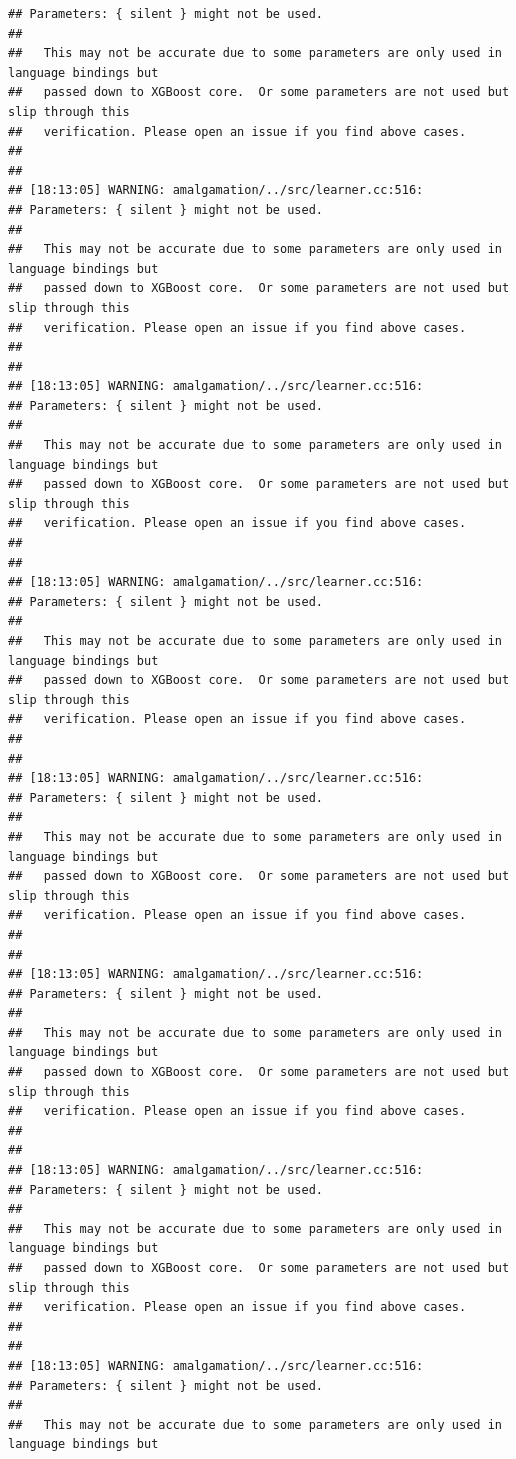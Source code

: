 \documentclass[AMS,STIX2COL]{WileyNJD-v2}\usepackage[]{graphicx}\usepackage[]{color}
\makeatletter
\newenvironment{kframe}{%
 \def\at@end@of@kframe{}%
 \ifinner\ifhmode%
  \def\at@end@of@kframe{\end{minipage}}%
  \begin{minipage}{\columnwidth}%
 \fi\fi%
 \def\FrameCommand##1{\hskip\@totalleftmargin \hskip-\fboxsep
 \colorbox{shadecolor}{##1}\hskip-\fboxsep
     \hskip-\linewidth \hskip-\@totalleftmargin \hskip\columnwidth}%
 \MakeFramed {\advance\hsize-\width
   \@totalleftmargin\z@ \linewidth\hsize
   \@setminipage}}%
 {\par\unskip\endMakeFramed%
 \at@end@of@kframe}
\newenvironment{knitrout}{}{} %
\makeatother
\begin{document}
\begin{knitrout}
\begin{kframe}
\begin{verbatim}
## Parameters: { silent } might not be used.
## 
##   This may not be accurate due to some parameters are only used in language bindings but
##   passed down to XGBoost core.  Or some parameters are not used but slip through this
##   verification. Please open an issue if you find above cases.
## 
## 
## [18:13:05] WARNING: amalgamation/../src/learner.cc:516: 
## Parameters: { silent } might not be used.
## 
##   This may not be accurate due to some parameters are only used in language bindings but
##   passed down to XGBoost core.  Or some parameters are not used but slip through this
##   verification. Please open an issue if you find above cases.
## 
## 
## [18:13:05] WARNING: amalgamation/../src/learner.cc:516: 
## Parameters: { silent } might not be used.
## 
##   This may not be accurate due to some parameters are only used in language bindings but
##   passed down to XGBoost core.  Or some parameters are not used but slip through this
##   verification. Please open an issue if you find above cases.
## 
## 
## [18:13:05] WARNING: amalgamation/../src/learner.cc:516: 
## Parameters: { silent } might not be used.
## 
##   This may not be accurate due to some parameters are only used in language bindings but
##   passed down to XGBoost core.  Or some parameters are not used but slip through this
##   verification. Please open an issue if you find above cases.
## 
## 
## [18:13:05] WARNING: amalgamation/../src/learner.cc:516: 
## Parameters: { silent } might not be used.
## 
##   This may not be accurate due to some parameters are only used in language bindings but
##   passed down to XGBoost core.  Or some parameters are not used but slip through this
##   verification. Please open an issue if you find above cases.
## 
## 
## [18:13:05] WARNING: amalgamation/../src/learner.cc:516: 
## Parameters: { silent } might not be used.
## 
##   This may not be accurate due to some parameters are only used in language bindings but
##   passed down to XGBoost core.  Or some parameters are not used but slip through this
##   verification. Please open an issue if you find above cases.
## 
## 
## [18:13:05] WARNING: amalgamation/../src/learner.cc:516: 
## Parameters: { silent } might not be used.
## 
##   This may not be accurate due to some parameters are only used in language bindings but
##   passed down to XGBoost core.  Or some parameters are not used but slip through this
##   verification. Please open an issue if you find above cases.
## 
## 
## [18:13:05] WARNING: amalgamation/../src/learner.cc:516: 
## Parameters: { silent } might not be used.
## 
##   This may not be accurate due to some parameters are only used in language bindings but

\end{verbatim}
\end{kframe}
\end{knitrout}
\end{document}
